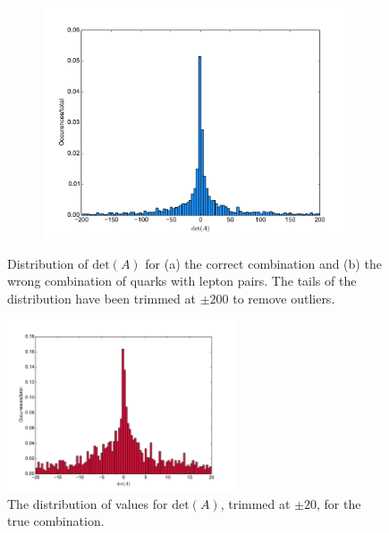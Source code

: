 \documentclass[twoside,english]{uiofysmaster}
\begin{document}
\begin{figure}[hbt]
	\begin{subfigure}[b]{0.6\textwidth}
		\includegraphics[width=\textwidth]{figures/improving_combinatorics/histogram_detA_wrongcombo_herwigpp-nosmear.pdf}
		\caption{ } 
		\label{fig:detA_distribution_b}
	\end{subfigure}
	\caption{Distribution of $\mathrm{det}(A)$ for (a) the correct combination and (b) the wrong combination of quarks with lepton pairs. The tails of the distribution have been trimmed at $\pm 200$ to remove outliers.}
	\label{fig:detA_distribution}
\end{figure}


\begin{figure}[hbt]
	\centering
	\includegraphics[width=0.6\textwidth]{figures/improving_combinatorics/histogram_detA_truecomb_trim20.pdf} 
	\caption{The distribution of values for $\mathrm{det}(A)$, trimmed at $\pm 20$, for the true combination.}
	\label{fig:detA_distribution_zoom}
\end{figure}
\end{document}
